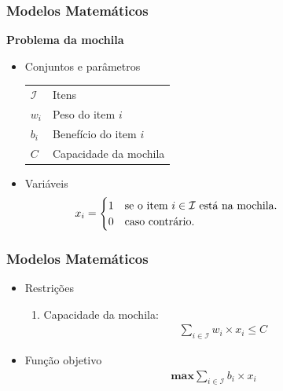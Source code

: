 \documentclass[mathsans,times]{beamer}
\begin{document}
\begin{frame}
	\frametitle{Modelos Matemáticos}
\textbf{Problema da mochila}
\vspace{3MM}
\begin{itemize}
	\item Conjuntos e parâmetros
	\begin{table}[H]
		\begin{tabular}{ll}
			$\mathcal{I}$   & Itens \\ 
			$w_{i}$         & Peso do item $i$\\
			$b_{i}$         & Benefício do item $i$\\
			$C$             & Capacidade da mochila\\
		\end{tabular} 
	\end{table}
	\item Variáveis
	\begin{equation*}
		x_i=\begin{cases}
			1 & \parbox[t]{.6\textwidth}{\mbox{se o item $i \in \mathcal{I}$ está na mochila.}}\\
			0 & \mbox{caso contrário.}
		\end{cases}
	\end{equation*}
	
\end{itemize}
\end{frame}

\begin{frame}
	\frametitle{Modelos Matemáticos}
\begin{itemize}
	\item Restrições
	\begin{enumerate}
		\item Capacidade da mochila:
		\begin{equation}
			\begin{split} 
				\label{eq:r1}
				\sum_{i \in \mathcal{I}} w_i \times x_i \leq C
			\end{split}
		\end{equation}
	\end{enumerate}
	
	\item Função objetivo
	\begin{equation}
		\begin{split} 
			\label{eq:obj}
			\textbf{max} \sum_{i \in \mathcal{I}} b_i \times x_i
		\end{split}
	\end{equation}
\end{itemize}
\end{frame}
\end{document}
